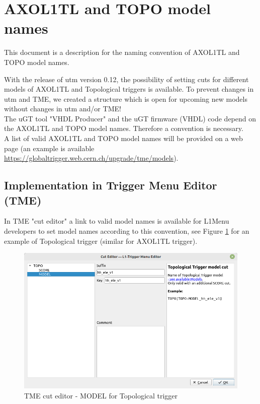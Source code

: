 
\section{AXOL1TL and TOPO model names}

This document is a description for the naming convention of AXOL1TL and TOPO model names.

With the release of utm version 0.12, the possibility of setting cuts for different models of AXOL1TL and Topological triggers is available.
To prevent changes in utm and TME, we created a structure which is open for upcoming new models without changes in utm and/or TME!\\
The uGT tool "VHDL Producer" and the uGT firmware (VHDL) code depend on the AXOL1TL and TOPO model names. Therefore a convention is necessary.\\
A list of valid AXOL1TL and TOPO model names will be provided on a web page (an example is available \url{https://globaltrigger.web.cern.ch/upgrade/tme/models}).

\subsection{Implementation in Trigger Menu Editor (TME)}

In TME "cut editor" a link to valid model names is available for L1Menu developers to set model names according to this convention, see Figure \ref{fig:tme_model_cut} for an example of Topological trigger (similar for AXOL1TL trigger).

\begin{figure}[htb]
\centering
\includegraphics[width=15cm]{figures/tme_model_cut}
\caption{TME cut editor - MODEL for Topological trigger}
\label{fig:tme_model_cut}
\end{figure}

